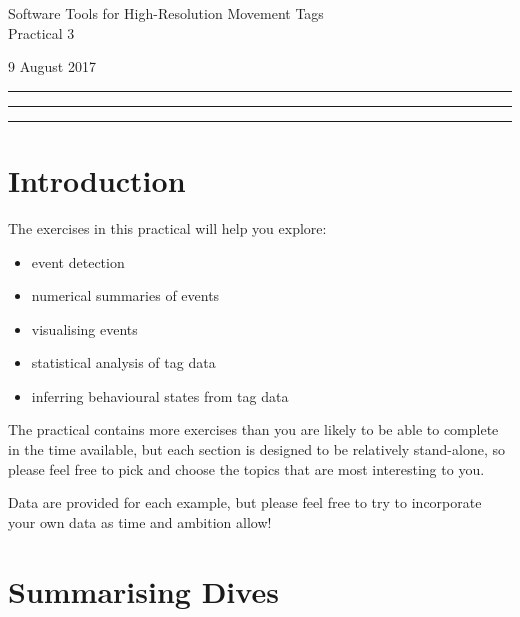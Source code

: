 \documentclass[12pt]{article}\usepackage[]{graphicx}\usepackage[]{color}
\begin{document}
\begin{center}
{\Large Software Tools for High-Resolution Movement Tags\\
Practical 3}

\bigskip

{\large 9 August 2017}
\bigskip
\rule[0cm]{12.7cm}{0.1cm} \vspace{-0.5cm} \tableofcontents
\rule[0cm]{12.7cm}{0.05cm} \vspace{-0.5cm}
\begin{center}
\rule[0cm]{7cm}{0.05cm}
\end{center}

\bigskip
\end{center}



\section{Introduction}
The exercises in this practical will help you explore:
\begin{itemize}
  \item event detection
  \item numerical summaries of events
  \item visualising events
  \item statistical analysis of tag data
  \item inferring behavioural states from tag data
\end{itemize}

The practical contains more exercises than you are likely to be able to complete in the time available, but each section is designed to be relatively stand-alone, so please feel free to pick and choose the topics that are most interesting to you.

Data are provided for each example, but please feel free to try to incorporate your own data as time and ambition allow!

\section{Summarising Dives}
\end{document}
